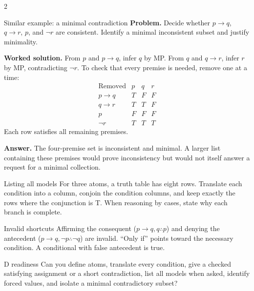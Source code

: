\documentclass[10pt]{article}
\begin{document}
\begin{multicols}{2}
\begin{workedbox}{Similar example: a minimal contradiction}
\textbf{Problem.} Decide whether $p\to q$, $q\to r$, $p$, and $\neg r$ are
consistent. Identify a minimal inconsistent subset and justify minimality.

\textbf{Worked solution.} From $p$ and $p\to q$, infer $q$ by MP. From
$q$ and $q\to r$, infer $r$ by MP, contradicting $\neg r$. To check that
every premise is needed, remove one at a time:
\[
\begin{array}{l|ccc}
\text{Removed}&p&q&r\\\hline
p\to q&T&F&F\\
q\to r&T&T&F\\
p&F&F&F\\
\neg r&T&T&T
\end{array}
\]
Each row satisfies all remaining premises.

\textbf{Answer.} The four-premise set is inconsistent and minimal. A larger
list containing these premises would prove inconsistency but would not itself
answer a request for a minimal collection.
\end{workedbox}

\begin{methodbox}{Listing all models}
For three atoms, a truth table has eight rows. Translate each condition into a
column, conjoin the condition columns, and keep exactly the rows where the
conjunction is T. When reasoning by cases, state why each branch is complete.
\end{methodbox}

\begin{warningbox}{Invalid shortcuts}
Affirming the consequent ($p\to q,q\therefore p$) and denying the antecedent
($p\to q,\neg p\therefore\neg q$) are invalid. ``Only if'' points toward the
necessary condition. A conditional with false antecedent is true.
\end{warningbox}

\begin{checklistbox}{D readiness}
Can you define atoms, translate every condition, give a checked satisfying
assignment or a short contradiction, list all models when asked, identify
forced values, and isolate a minimal contradictory subset?
\end{checklistbox}
\end{multicols}

\clearpage
\end{document}
